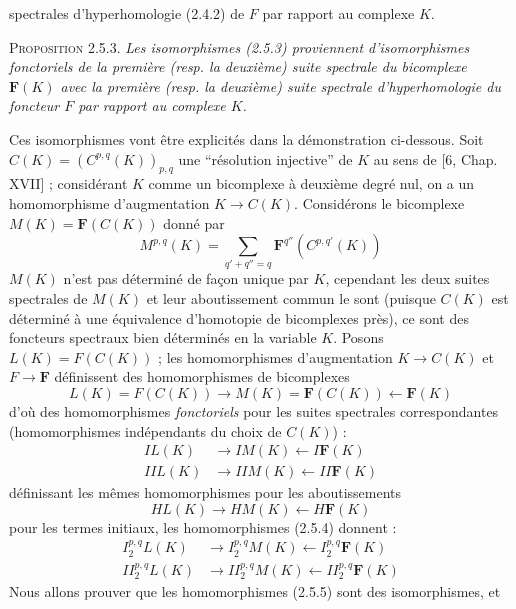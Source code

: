 
\noindent spectrales d'hyperhomologie (2.4.2) de $F$ par rapport au complexe
$K$.

\textsc{Proposition 2.5.3.} \textit{Les isomorphismes \textup{(2.5.3)}
proviennent d'isomorphismes fonctoriels de la première \textup{(}resp. la deuxième\textup{)}
suite spectrale du bicomplexe $\mathbf F(K)$ avec la première \textup{(}resp. la
deuxième\textup{)} suite spectrale d'hyperhomologie du foncteur $F$ par rapport au
complexe $K$.}

Ces isomorphismes vont être explicités dans la démonstration ci-dessous. Soit
$C(K)=(C^{p,q}(K))_{p,q}$ une ``résolution injective'' de $K$ au sens de
[6, Chap. XVII] ; considérant $K$ comme un bicomplexe à deuxième degré nul, on
a un homomorphisme d'augmentation $K\to C(K)$. Considérons le
bicomplexe $M(K)=\mathbf F(C(K))$ donné par
\[
M^{p,q}(K)=\sum_{q'+q''=q}\mathbf F^{q''}(C^{p,q'}(K))
\]
$M(K)$ n'est pas déterminé de façon unique par $K$, cependant les deux suites
spectrales de $M(K)$ et leur aboutissement commun le sont (puisque $C(K)$ est
déterminé à une équivalence d'homotopie de bicomplexes près), ce sont des
foncteurs spectraux bien déterminés en la variable $K$. Posons
$L(K)=F(C(K))$ ; les homomorphismes d'augmentation
$K\to C(K)$ et $F\to\mathbf F$ définissent des
homomorphismes de bicomplexes
\[
L(K)=F(C(K))\to M(K)=\mathbf F(C(K))
\leftarrow\mathbf F(K)
\]
d'où des homomorphismes \textit{fonctoriels} pour les suites spectrales
correspondantes (homomorphismes indépendants du choix de $C(K)$) :
\[
\tag{2.5.4}
\begin{aligned}
I L(K)&\to I M(K)\leftarrow I\mathbf F(K)\\
IIL(K)&\to IIM(K)\leftarrow II\mathbf F(K)
\end{aligned}
\]
définissant les mêmes homomorphismes pour les aboutissements
\[
HL(K)\to HM(K)\leftarrow H\mathbf F(K)
\]
pour les termes initiaux, les homomorphismes (2.5.4) donnent :
\[
\tag{2.5.5}
\begin{aligned}
I_2^{p,q}L(K)&\to I_2^{p,q}M(K)
\leftarrow I_2^{p,q}\mathbf F(K)\\
II_2^{p,q}L(K)&\to II_2^{p,q}M(K)
\leftarrow II_2^{p,q}\mathbf F(K)
\end{aligned}
\]
Nous allons prouver que les homomorphismes (2.5.5) sont des isomorphismes, et
